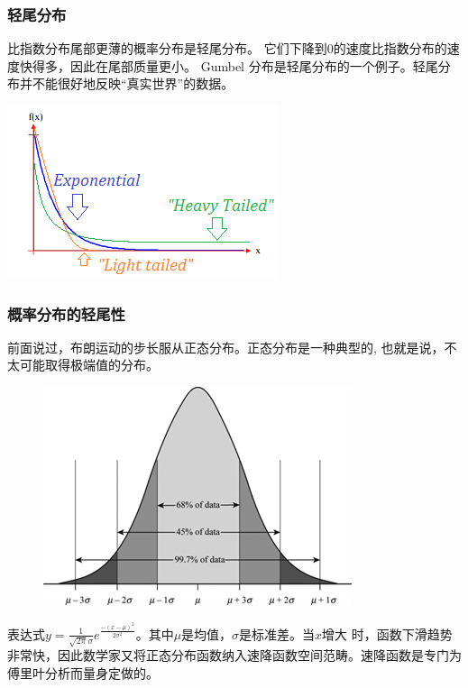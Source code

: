 \documentclass{beamer}
\begin{document}
\begin{frame}
\frametitle{轻尾分布}
\qquad 比指数分布尾部更薄的概率分布是轻尾分布。 它们下降到$0$的速度比指数分布的速度快得多，因此在尾部质量更小。 Gumbel 分布是轻尾分布的一个例子。轻尾分布并不能很好地反映“真实世界”的数据。



\centering\includegraphics[scale=0.5]{image/light-tailed.png}


\end{frame}

\begin{frame}

\frametitle{概率分布的轻尾性}
\qquad 前面说过，布朗运动的步长服从正态分布。正态分布是一种典型的{\color{red}{轻尾分布}}, 也就是说，不太可能取得极端值的分布。

\begin{figure}
	\centering\includegraphics[scale=0.35]{image/normal_distribution.png}
\end{figure}

表达式$y= \frac{1}{\sqrt{2\pi}\sigma}e^{\frac{-\left ( x-\mu  \right )^{2}}{2\sigma ^{2}}}$。其中$\mu$是均值，$\sigma$是标准差。当$x$增大
时，函数下滑趋势非常快，因此数学家又将正态分布函数纳入速降函数空间范畴。速降函数是专门为傅里叶分析而量身定做的。

\end{frame}
\end{document}
